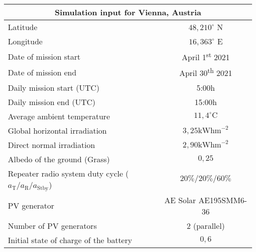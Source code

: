 \footnotesize
\begin{tabular}{|l|c|}
	\hline
	\multicolumn{2}{|c|}{\textbf{Simulation input for Vienna, Austria}} \\
	\hline
	Latitude & $48,210^\circ$ N \\
	Longitude & $16,363^\circ$ E \\ 
	Date of mission start & April 1\textsuperscript{st} 2021 \\
	Date of mission end & April 30\textsuperscript{th} 2021 \\
	Daily mission start (UTC) & 5:00h \\
	Daily mission end (UTC) & 15:00h \\
	Average ambient temperature & $11,4^\circ \mathrm{C}$ \\
	Global horizontal irradiation & $3,25\mathrm{kWhm}^{-2}$ \\
	Direct normal irradiation & $2,90\mathrm{kWhm}^{-2}$ \\
	Albedo of the ground (Grass) & $0,25$ \\
	Repeater radio system duty cycle ($a_\mathrm{T}/a_\mathrm{R}/a_\mathrm{Stby}$) & $20\%/20\%/60\%$ \\
	PV generator & AE Solar AE195SMM6-36 \\
	Number of PV generators & $2$ (parallel) \\
	Initial state of charge of the battery & $0,6$ \\
	\hline
\end{tabular}
